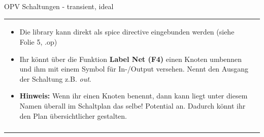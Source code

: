 \begin{frame}[t]{OPV Schaltungen - transient, ideal}
\begin{spacing}{0.9}
\begin{tiny}
\begin{table}[h!]
\begin{tabular}{p{3cm} p{7cm}}
\begin{minipage}{.7\textwidth}
\begin{itemize}
              \item Die library kann direkt als spice directive eingebunden werden (siehe Folie 5, .op)
              \item Ihr könnt über die Funktion \textbf{Label Net (F4)} einen Knoten umbennen und ihm mit einem Symbol für In-/Output versehen. Nennt den Ausgang der Schaltung z.B. \textit{out}.
              \item \textbf{Hinweis:} Wenn ihr einen Knoten benennt, dann kann liegt unter diesem Namen überall im Schaltplan das selbe! Potential an.
                    Dadurch könnt ihr den Plan übersichtlicher gestalten.
            \end{itemize}
          \end{minipage}
          \\
                                              & \\
          \hline
        \end{tabular}

      \end{table}

    \end{tiny} \end{spacing}

\end{frame}

